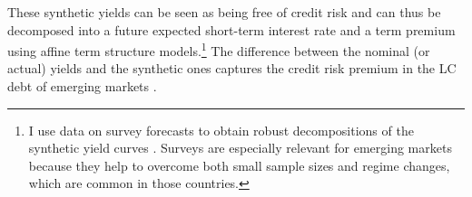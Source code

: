 {%
These synthetic yields can be seen as being free of credit risk and 
can thus be decomposed into a 
future expected short-term interest rate and a term premium using affine term structure models.\footnote{ I use data on survey forecasts to obtain robust decompositions of the synthetic yield curves \cite[see][]{Guimaraes:2014}. Surveys are especially relevant for emerging markets because they help to overcome both small sample sizes and regime changes, which are common in those countries.}
The difference between the nominal (or actual) yields and the synthetic ones captures the credit risk premium in the LC debt of emerging markets \citep{DuSchreger:2016JoF}.

}

